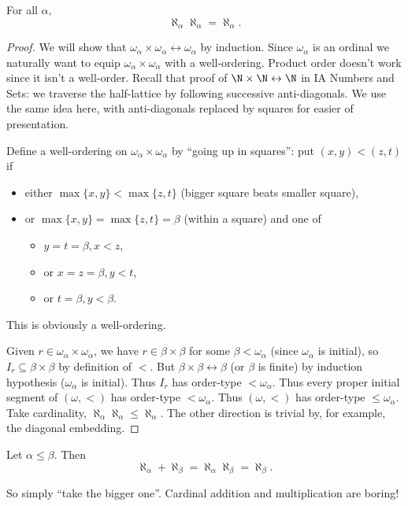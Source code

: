 \documentclass[a4paper]{article}
\newcommand*{\biject}{\leftrightarrow}
\begin{document}
\begin{theorem}
  For all \(\alpha\),
  \[
    \aleph_\alpha \aleph_\alpha = \aleph_\alpha.
  \]
\end{theorem}

\begin{proof}
  We will show that \(\omega_\alpha \times \omega_\alpha \biject \omega_\alpha\) by induction. Since \(\omega_\alpha\) is an ordinal we naturally want to equip \(\omega_\alpha \times \omega_\alpha\) with a well-ordering. Product order doesn't work since it isn't a well-order. Recall that proof of \(\N \times \N \biject \N\) in IA Numbers and Sets: we traverse the half-lattice by following successive anti-diagonals. We use the same idea here, with anti-diagonals replaced by squares for easier of presentation.

  Define a well-ordering on \(\omega_\alpha \times \omega_\alpha\) by ``going up in squares'': put \((x, y) < (z, t)\) if
  \begin{itemize}
  \item either \(\max\{x, y\} < \max\{z, t\}\) (bigger square beats smaller square),
  \item or \(\max\{x, y\} = \max\{z, t\} = \beta\) (within a square) and one of
    \begin{itemize}
    \item \(y = t = \beta, x < z\),
    \item  or \(x = z = \beta, y < t\),
    \item or \(t = \beta, y < \beta\).
    \end{itemize}
  \end{itemize}
 This is obviously a well-ordering.

  Given \(r \in \omega_\alpha \times \omega_\alpha\), we have \(r \in \beta \times \beta\) for some \(\beta < \omega_\alpha\) (since \(\omega_\alpha\) is initial), so \(I_r \subseteq \beta \times \beta\) by definition of \(<\). But \(\beta \times \beta \biject \beta\) (or \(\beta\) is finite) by induction hypothesis (\(\omega_\alpha\) is initial). Thus \(I_r\) has order-type \(< \omega_\alpha\). Thus every proper initial segment of \((\omega, <)\) has order-type \(< \omega_\alpha\). Thus \((\omega, <)\) has order-type \(\leq \omega_\alpha\). Take cardinality, \(\aleph_\alpha \aleph_\alpha \leq \aleph_\alpha\). The other direction is trivial by, for example, the diagonal embedding.
\end{proof}

\begin{corollary}
  Let \(\alpha \leq \beta\). Then
  \[
    \aleph_\alpha + \aleph_\beta = \aleph_\alpha \aleph_\beta = \aleph_\beta.
  \]
\end{corollary}
So simply ``take the bigger one''. Cardinal addition and multiplication are boring!
\end{document}
